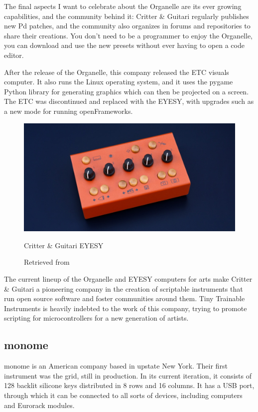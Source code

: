 The final aspects I want to celebrate about the Organelle are its ever growing capabilities, and the community behind it: Critter \& Guitari regularly publishes new \acrshort{Pd} patches, and the community also organizes in forums and repositories to share their creations. You don't need to be a programmer to enjoy the Organelle, you can download and use the new presets without ever having to open a code editor.

After the release of the Organelle, this company released the ETC visuals computer. It also runs the Linux operating system, and it uses the pygame Python library for generating graphics which can then be projected on a screen.  The ETC was discontinued and replaced with the EYESY, with upgrades such as a new mode for running openFrameworks.

\begin{figure}[ht]
  \centering
  \includegraphics[width=0.75\linewidth,height=0.25\textheight,keepaspectratio]{images/critter-and-guitari-eyesy.jpg}
  \caption{Critter \& Guitari EYESY}
  \caption*{Retrieved from \cite{website-critter-and-guitari-current}}
  \label{fig:critter-and-guitari-eyesy}
\end{figure}

The current lineup of the Organelle and EYESY computers for arts make Critter \& Guitari a pioneering company in the creation of scriptable instruments that run open source software and foster communities around them. Tiny Trainable Instruments is heavily indebted to the work of this company, trying to promote scripting for microcontrollers for a new generation of artists.

\subsection{monome}

monome \cite{website-monome-current} is an American company based in upstate New York. Their first instrument was the grid, still in production. In its current iteration, it consists of 128 backlit silicone keys distributed in 8 rows and 16 columns. It has a USB port, through which it can be connected to all sorts of devices, including computers and Eurorack modules.

